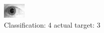 \begin{figure}[h!]
\begin{center}
\includegraphics[width=0.60\columnwidth]{figures/ID1869_class_4_target_3.png}
\end{center}
\caption{ Classification: 4 actual target: 3}
\label{fig:ID1869_class_4_target_3}
\end{figure}
